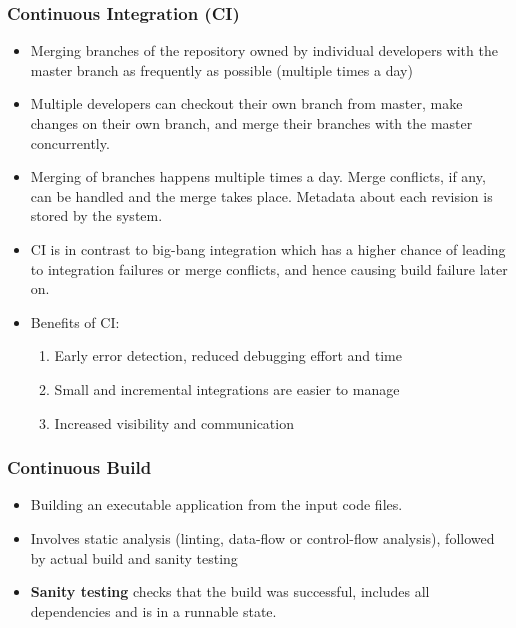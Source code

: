 \documentclass{article}
\begin{document}
\subsubsection{Continuous Integration (CI)}
\begin{itemize}
    \item Merging branches of the repository owned by individual developers with the master branch as frequently as possible (multiple times a day)
    
    \item Multiple developers can checkout their own branch from master, make changes on their own branch, and merge their branches with the master concurrently. 
    
    \item Merging of branches happens multiple times a day. Merge conflicts, if any, can be handled and the merge takes place. Metadata about each revision is stored by the system. 
    
    \item CI is in contrast to big-bang integration which has a higher chance of leading to integration failures or merge conflicts, and hence causing build failure later on. 
    \item Benefits of CI:
    \begin{enumerate}
        \item Early error detection, reduced debugging effort and time
        
        \item Small and incremental integrations are easier to manage
        
        \item Increased visibility and communication
    \end{enumerate}
\end{itemize}

\subsubsection{Continuous Build}
\begin{itemize}
    \item Building an executable application from the input code files. 
    
    \item Involves static analysis (linting, data-flow or control-flow analysis), followed by actual build and sanity testing
    
    \item \textbf{Sanity testing} checks that the build was successful, includes all dependencies and is in a runnable state. 
\end{itemize}
\end{document}
